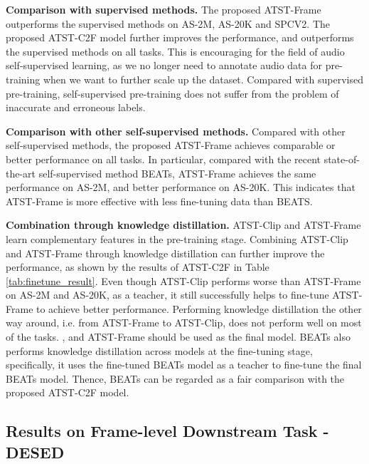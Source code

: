 \textbf{Comparison with supervised methods.} The proposed ATST-Frame outperforms the supervised methods on AS-2M, AS-20K and SPCV2. The proposed ATST-C2F model further improves the performance, and outperforms the supervised methods on all tasks. This is encouraging for the field of audio self-supervised learning, as we no longer need to annotate audio data for pre-training when we want to further scale up the dataset. Compared with supervised pre-training, self-supervised pre-training does not suffer from the problem of inaccurate and erroneous labels.


\textbf{Comparison with other self-supervised methods.} Compared with other self-supervised methods, the proposed ATST-Frame achieves comparable or better performance on all tasks. In particular, compared with the recent state-of-the-art self-supervised method BEATs\cite{chen_beats_2022}, ATST-Frame achieves the same performance on AS-2M, and better performance on AS-20K. This indicates that ATST-Frame is more effective with less fine-tuning data than BEATS. 

\textbf{Combination through knowledge distillation.} 
ATST-Clip and ATST-Frame learn complementary features in the pre-training stage. Combining ATST-Clip and ATST-Frame through knowledge distillation can further improve the performance, as shown by the results of ATST-C2F in Table \ref{tab:finetune_result}. Even though ATST-Clip performs worse than ATST-Frame on AS-2M and AS-20K, as a teacher, it still successfully helps to fine-tune ATST-Frame to achieve better performance. 
Performing knowledge distillation the other way around, i.e. from ATST-Frame to ATST-Clip, does not perform well on most of the tasks. 
, and ATST-Frame should be used as the final model.
BEATs\cite{chen_beats_2022} also performs knowledge distillation across models at the fine-tuning stage, specifically, it uses the fine-tuned BEATs model as a teacher to fine-tune the final BEATs model. Thence, BEATs can be regarded as a fair comparison with the proposed ATST-C2F model.


\subsection{Results on Frame-level Downstream Task - DESED}
\label{sec:dcase}

